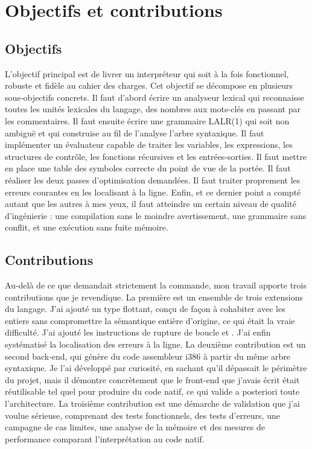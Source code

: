 \section{Objectifs et contributions}

\subsection{Objectifs}

L'objectif principal est de livrer un interpréteur \ilang{} qui soit à la fois
fonctionnel, robuste et fidèle au cahier des charges. Cet objectif se décompose en
plusieurs sous-objectifs concrets. Il faut d'abord écrire un analyseur lexical qui
reconnaisse toutes les unités lexicales du langage, des nombres aux mots-clés en
passant par les commentaires. Il faut ensuite écrire une grammaire LALR(1) qui
soit non ambiguë et qui construise au fil de l'analyse l'arbre syntaxique. Il faut
implémenter un évaluateur capable de traiter les variables, les expressions, les
structures de contrôle, les fonctions récursives et les entrées-sorties. Il faut
mettre en place une table des symboles correcte du point de vue de la portée. Il
faut réaliser les deux passes d'optimisation demandées. Il faut traiter proprement
les erreurs courantes en les localisant à la ligne. Enfin, et ce dernier point a
compté autant que les autres à mes yeux, il faut atteindre un certain niveau de
qualité d'ingénierie : une compilation sans le moindre avertissement, une grammaire
sans conflit, et une exécution sans fuite mémoire.

\subsection{Contributions}

Au-delà de ce que demandait strictement la commande, mon travail apporte trois
contributions que je revendique. La première est un ensemble de trois extensions
du langage. J'ai ajouté un type flottant, conçu de façon à cohabiter avec les
entiers sans compromettre la sémantique entière d'origine, ce qui était la vraie
difficulté. J'ai ajouté les instructions de rupture de boucle  et
. J'ai enfin systématisé la localisation des erreurs à la ligne.
La deuxième contribution est un second back-end, qui génère du code assembleur
i386 à partir du même arbre syntaxique. Je l'ai développé par curiosité, en sachant
qu'il dépassait le périmètre du projet, mais il démontre concrètement que le
front-end que j'avais écrit était réutilisable tel quel pour produire du code
natif, ce qui valide a posteriori toute l'architecture. La troisième contribution
est une démarche de validation que j'ai voulue sérieuse, comprenant des tests
fonctionnels, des tests d'erreurs, une campagne de cas limites, une analyse de la
mémoire et des mesures de performance comparant l'interprétation au code natif.

